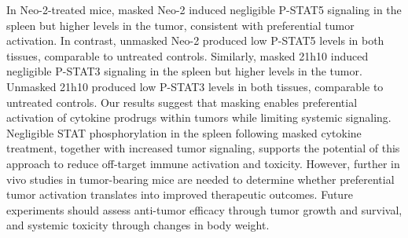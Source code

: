 {{    }
    {
    In Neo-2-treated mice, masked Neo-2 induced negligible P-STAT5 signaling in the spleen but higher levels in the tumor, consistent with preferential tumor activation. In contrast, unmasked Neo-2 produced low P-STAT5 levels in both tissues, comparable to untreated controls. Similarly, masked 21h10 induced negligible P-STAT3 signaling in the spleen but higher levels in the tumor. Unmasked 21h10 produced low P-STAT3 levels in both tissues, comparable to untreated controls. 
    }
    {
    Our results suggest that masking enables preferential activation of cytokine prodrugs within tumors while limiting systemic signaling. Negligible STAT phosphorylation in the spleen following masked cytokine treatment, together with increased tumor signaling, supports the potential of this approach to reduce off-target immune activation and toxicity. However, further in vivo studies in tumor-bearing mice are needed to determine whether preferential tumor activation translates into improved therapeutic outcomes. Future experiments should assess anti-tumor efficacy through tumor growth and survival, and systemic toxicity through changes in body weight.
    }}

    \newpage
    